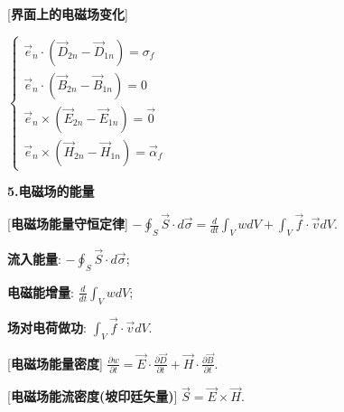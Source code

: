 [\textbf{界面上的电磁场变化}]\par
\qquad $\begin{cases}\vec e_n\cdot(\vec D_{2n}-\vec D_{1n})=\sigma_f\\\vec e_n\cdot(\vec B_{2n}-\vec B_{1n})=0\\\vec e_n\times(\vec E_{2n}-\vec E_{1n})=\vec 0\\\vec e_n\times(\vec H_{2n}-\vec H_{1n})=\vec \alpha_f\end{cases}$

\clearpage

\begin{center}
 \textbf{5.电磁场的能量}
\end{center}

[\textbf{电磁场能量守恒定律}] $-\oint_S\vec S\cdot d\vec\sigma=\frac{d}{dt}\int_V w dV+\int_V\vec f\cdot\vec vdV$.\par
\qquad \textbf{流入能量}: $-\oint_S\vec S\cdot d\vec\sigma$;\par
\qquad \textbf{电磁能增量}: $\frac{d}{dt}\int_V w dV$;\par
\qquad \textbf{场对电荷做功}: $\int_V\vec f\cdot\vec vdV$.\par

[\textbf{电磁场能量密度}] $\frac{\partial w}{\partial t}=\vec E\cdot\frac{\partial\vec D}{\partial t}+\vec H\cdot\frac{\partial \vec B}{\partial t}$.\par

[\textbf{电磁场能流密度(坡印廷矢量)}] $\vec S=\vec E\times\vec H$.\par

